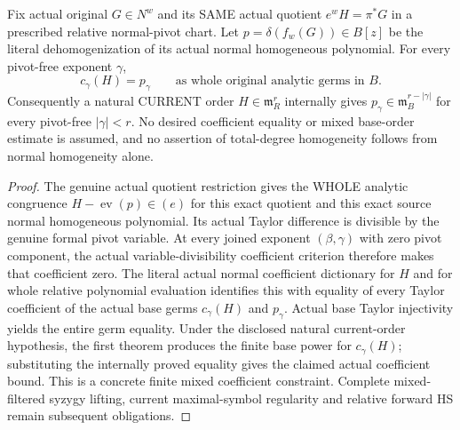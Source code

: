 \begin{theorem}
\label{hir:actual-relative-quotient-mixed-fibre-coefficient-orders}
\leanok
Fix actual original $G\in N^w$ and its SAME actual quotient
$e^wH=\pi^*G$ in a prescribed relative normal-pivot chart. Let
$p=\delta(f_w(G))\in B[z]$ be the literal dehomogenization of its actual
normal homogeneous polynomial. For every pivot-free exponent $\gamma$,
\[
 c_\gamma(H)=p_\gamma\qquad\text{as whole original analytic germs in }B.
\]
Consequently a natural CURRENT order $H\in\mathfrak m_R^r$ internally gives
$p_\gamma\in\mathfrak m_B^{r-|\gamma|}$ for every pivot-free
$|\gamma|<r$. No desired coefficient equality or mixed base-order estimate is
assumed, and no assertion of total-degree homogeneity follows from normal
homogeneity alone.
\end{theorem}
\begin{proof}
The genuine actual quotient restriction gives the WHOLE analytic congruence
$H-\operatorname{ev}(p)\in(e)$ for this exact quotient and this exact source
normal homogeneous polynomial. Its actual Taylor difference is divisible by
the genuine formal pivot variable. At every joined exponent $(\beta,\gamma)$
with zero pivot component, the actual variable-divisibility coefficient
criterion therefore makes that coefficient zero. The literal actual normal
coefficient dictionary for $H$ and for whole relative polynomial evaluation
identifies this with equality of every Taylor coefficient of the actual base
germs $c_\gamma(H)$ and $p_\gamma$. Actual base Taylor injectivity yields the
entire germ equality. Under the disclosed natural current-order hypothesis,
the first theorem produces the finite base power for $c_\gamma(H)$; substituting
the internally proved equality gives the claimed actual coefficient bound.
This is a concrete finite mixed coefficient constraint. Complete mixed-filtered
syzygy lifting, current maximal-symbol regularity and relative forward HS remain
subsequent obligations.
\end{proof}
